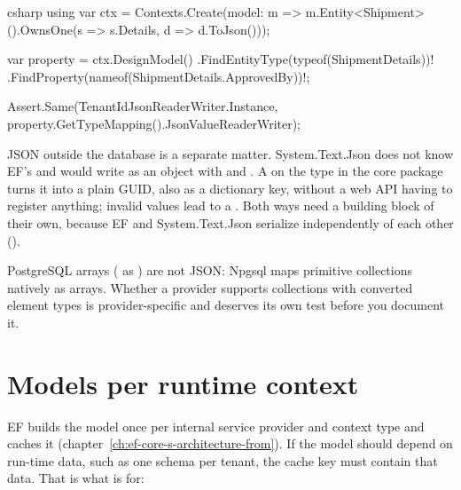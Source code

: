 \begin{sourcecode}{csharp}
using var ctx = Contexts.Create(model: m =>
    m.Entity<Shipment>().OwnsOne(s => s.Details, d => d.ToJson()));

var property = ctx.DesignModel()
    .FindEntityType(typeof(ShipmentDetails))!
    .FindProperty(nameof(ShipmentDetails.ApprovedBy))!;

Assert.Same(TenantIdJsonReaderWriter.Instance,
    property.GetTypeMapping().JsonValueReaderWriter);
\end{sourcecode}

JSON outside the database is a separate matter. System.Text.Json does not know EF's
 and would write
 as an object with  and . A
on the type in the core package turns it into a plain GUID, also as a dictionary key, without a
web API having to register anything; invalid values lead to a
. Both ways need a building block of their own, because EF and
System.Text.Json serialize independently of each other
().

\begin{note}
  PostgreSQL arrays ( as ) are
  not JSON: Npgsql maps primitive collections natively as arrays. Whether a provider
  supports collections with converted element types is provider-specific and deserves its
  own test before you document it.
\end{note}

\chapter{Models per runtime context}\label{ch:models-per-runtime-context}

EF builds the model once per internal service provider and context type and caches it
(chapter~\ref{ch:ef-core-s-architecture-from}). If the model should depend on run-time data,
such as one schema per tenant, the cache key must contain that data. That is what
 is for:

